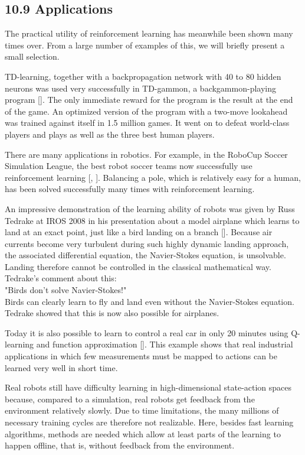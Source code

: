 \documentclass[10pt]{article}
\begin{document}
\subsection*{10.9 Applications}
The practical utility of reinforcement learning has meanwhile been shown many times over. From a large number of examples of this, we will briefly present a small selection.

TD-learning, together with a backpropagation network with 40 to 80 hidden neurons was used very successfully in TD-gammon, a backgammon-playing program [\cite{tesauro1995temporal}]. The only immediate reward for the program is the result at the end of the game. An optimized version of the program with a two-move lookahead was trained against itself in 1.5 million games. It went on to defeat world-class players and plays as well as the three best human players.

There are many applications in robotics. For example, in the RoboCup Soccer Simulation League, the best robot soccer teams now successfully use reinforcement learning [\cite{stone2005reinforcement}, \cite{robocup_simulator}]. Balancing a pole, which is relatively easy for a human, has been solved successfully many times with reinforcement learning.

An impressive demonstration of the learning ability of robots was given by Russ Tedrake at IROS 2008 in his presentation about a model airplane which learns to land at an exact point, just like a bird landing on a branch [\cite{tedrake2008learning}]. Because air currents become very turbulent during such highly dynamic landing approach, the associated differential equation, the Navier-Stokes equation, is unsolvable. Landing therefore cannot be controlled in the classical mathematical way. Tedrake's comment about this:\\
"Birds don't solve Navier-Stokes!"\\
Birds can clearly learn to fly and land even without the Navier-Stokes equation. Tedrake showed that this is now also possible for airplanes.

Today it is also possible to learn to control a real car in only 20 minutes using Q-learning and function approximation [\cite{riedmiller2007drive}]. This example shows that real industrial applications in which few measurements must be mapped to actions can be learned very well in short time.

Real robots still have difficulty learning in high-dimensional state-action spaces because, compared to a simulation, real robots get feedback from the environment relatively slowly. Due to time limitations, the many millions of necessary training cycles are therefore not realizable. Here, besides fast learning algorithms, methods are needed which allow at least parts of the learning to happen offline, that is, without feedback from the environment.
\end{document}
